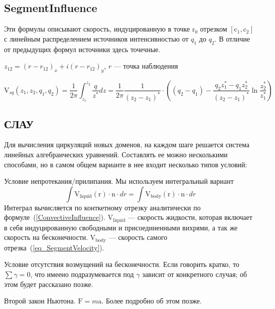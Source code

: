 \documentclass[14pt]{extreport}
\newcommand{\br}[1]{\boldsymbol{\mathrm{#1}}}
\renewcommand{\vec}[1]{\br{#1}}
\newenvironment{packed_enum}{
\begin{enumerate}
  \setlength{\itemsep}{1pt}
  \setlength{\parskip}{0pt}
  \setlength{\parsep}{0pt}
}{\end{enumerate}}
\begin{document}
\subsection{SegmentInfluence}
\label{SegmentInfluence}

Эти формулы описывают скорость, индуцированную в точке $\vec r_0$ отрезком $[\vec c_1, \vec c_2]$ с линейным распределением источников интенсивностью от $q_1$ до $q_2$. В отличие от предыдущих формул источники здесь точечные.

$z_{12} = (r - r_{12})_x + i (r-r_{12})_y$, $r$ --- точка наблюдения

\begin{equation}
\label{eq_SegmentInfluence_source}
\vec V_{sq} (z_1, z_2, q_1, q_2) = \dfrac{1}{2\pi}  \int_{z_1}^{z_2}\dfrac{q}{z^*} dz = \dfrac{1}{2\pi} \dfrac{1}{(z_2-z_1)^*} \cdot \left(  (q_2-q_1) - \dfrac{q_2 z_1^* - q_1 z_2^*}{(z_2-z_1)^*}\ln \dfrac{z_2^*}{z_1^*} \right)
\end{equation}

\subsection{СЛАУ}

Для вычисления циркуляций новых доменов, на каждом шаге решается система линейных алгебраических уравнений. Составлять ее можно несколькими способами, но в самом общем варианте в нее входит несколько типов условий:

\begin{packed_enum}
\item Условие непротекания/прилипания. Мы используем интегральный вариант
\begin{equation*}
\int{\vec V_\text{liquid}(\vec r) \cdot \vec n \cdot dr} = \int {\vec V_\text{body}(\vec r) \cdot \vec n \cdot dr}
\end{equation*}
Интеграл вычисляется по конткетному отрезку аналитически по формуле~(\ref{ConvectiveInfluence}). $\br V_\text{liquid}$ --- скорость жидкости, которая включает в себя индуцированную свободными и присоединенными вихрями, а так же скорость на бесконечности. $\br V_\text{body}$ --- скорость самого отрезка~(\ref{eq_SegmentVelocity}).
\item Условие отсутствия возмущений на бесконечности. Если говорить кратко, то $\sum \gamma = 0$, что имеено подразумевается под $\gamma$ зависит от конкретного случая; об этом будет рассказано позже.
\item Второй закон Ньютона. $\br F = m \br a$. Более подробно об этом позже.
\end{packed_enum}
\end{document}
